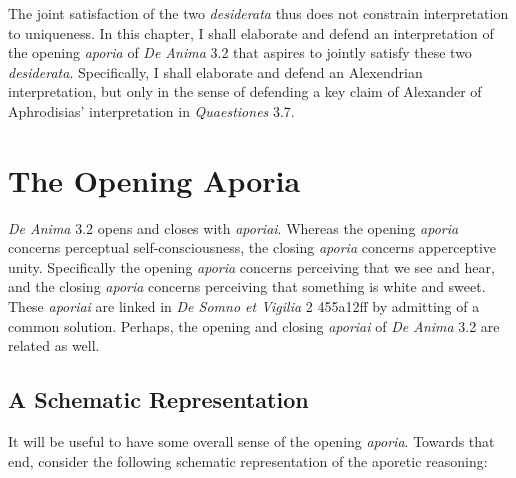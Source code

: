 The joint satisfaction of the two \emph{desiderata} thus does not constrain interpretation to uniqueness. In this chapter, I shall elaborate and defend an interpretation of the opening \emph{aporia} of \emph{De Anima} 3.2 that aspires to jointly satisfy these two \emph{desiderata}. Specifically, I shall elaborate and defend an Alexendrian interpretation, but only in the sense of defending a key claim of Alexander of Aphrodisias' interpretation in \emph{Quaestiones} 3.7.


\section{The Opening Aporia} %
\label{sec:the_opening_aporia}

\emph{De Anima} 3.2 opens and closes with \emph{aporiai}. Whereas the opening \emph{aporia} concerns perceptual self-consciousness, the closing \emph{aporia} concerns apperceptive unity. Spe\-cifically the opening \emph{aporia} concerns perceiving that we see and hear, and the closing \emph{aporia} concerns perceiving that something is white and sweet. These \emph{aporiai} are linked in \emph{De Somno et Vigilia} 2 455a12ff by admitting of a common solution. Perhaps, the opening and closing \emph{aporiai} of \emph{De Anima} 3.2 are related as well.

\subsection{A Schematic Representation} %
\label{sub:a_schematic_representation}

It will be useful to have some overall sense of the opening \emph{aporia}. Towards that end, consider the following schematic representation of the aporetic reasoning:

